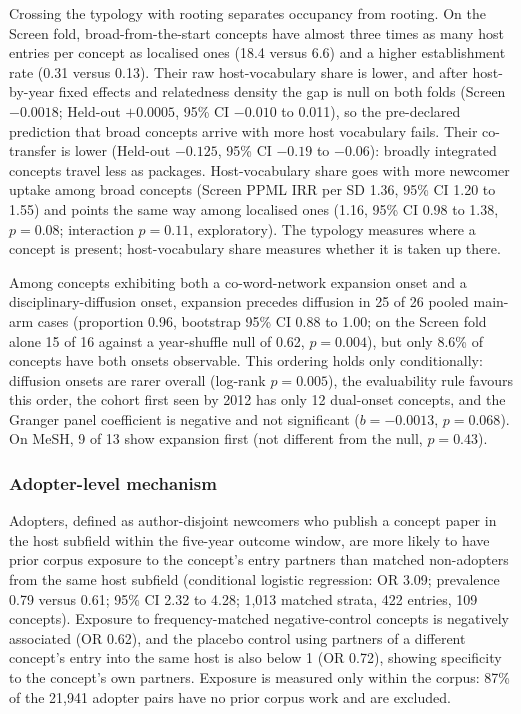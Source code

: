 \documentclass[11pt,letterpaper]{article}
\begin{document}
Crossing the typology with rooting separates occupancy from rooting. On the Screen fold, broad-from-the-start
concepts have almost three times as many host entries per concept as localised ones (18.4 versus 6.6) and a
higher establishment rate (0.31 versus 0.13). Their raw host-vocabulary share is lower, and after host-by-year
fixed effects and relatedness density the gap is null on both folds (Screen $-0.0018$; Held-out $+0.0005$,
95\% CI $-0.010$ to 0.011), so the pre-declared prediction that broad concepts arrive with more host vocabulary
fails. Their co-transfer is lower (Held-out $-0.125$, 95\% CI $-0.19$ to $-0.06$): broadly integrated concepts
travel less as packages. Host-vocabulary share goes with more newcomer uptake among broad concepts (Screen PPML IRR per SD 1.36,
95\% CI 1.20 to 1.55) and points the same way among localised ones (1.16, 95\% CI 0.98 to 1.38, $p = 0.08$;
interaction $p = 0.11$, exploratory). The typology measures where
a concept is present; host-vocabulary share measures whether it is taken up there.

Among concepts exhibiting both a co-word-network expansion onset and a disciplinary-diffusion onset, expansion
precedes diffusion in 25 of 26 pooled main-arm cases (proportion 0.96, bootstrap 95\% CI 0.88 to 1.00; on the
Screen fold alone 15 of 16 against a year-shuffle null of 0.62, $p = 0.004$), but only 8.6\% of concepts have
both onsets observable. This ordering holds only conditionally: diffusion onsets are rarer overall (log-rank
$p = 0.005$), the evaluability rule favours this order, the cohort first seen by 2012 has only 12 dual-onset
concepts, and the Granger panel coefficient is negative and not significant ($b = -0.0013$, $p = 0.068$). On
MeSH, 9 of 13 show expansion first (not different from the null, $p = 0.43$).

\subsubsection{Adopter-level mechanism}
\label{sec:rq2_adopter}

Adopters, defined as author-disjoint newcomers who publish a concept paper in the host subfield within the
five-year outcome window, are more likely to have prior corpus exposure to the concept's entry partners than matched non-adopters
from the same host subfield (conditional logistic regression: OR 3.09; prevalence 0.79 versus 0.61; 95\% CI
2.32 to 4.28; 1,013 matched strata, 422 entries, 109 concepts). Exposure to frequency-matched
negative-control concepts is negatively associated (OR 0.62), and the placebo control using partners of a
different concept's entry into the same host is also below 1 (OR 0.72), showing specificity to the concept's
own partners. Exposure is measured only within the corpus: 87\% of the 21,941 adopter pairs have no prior corpus
work and are excluded.
\end{document}
